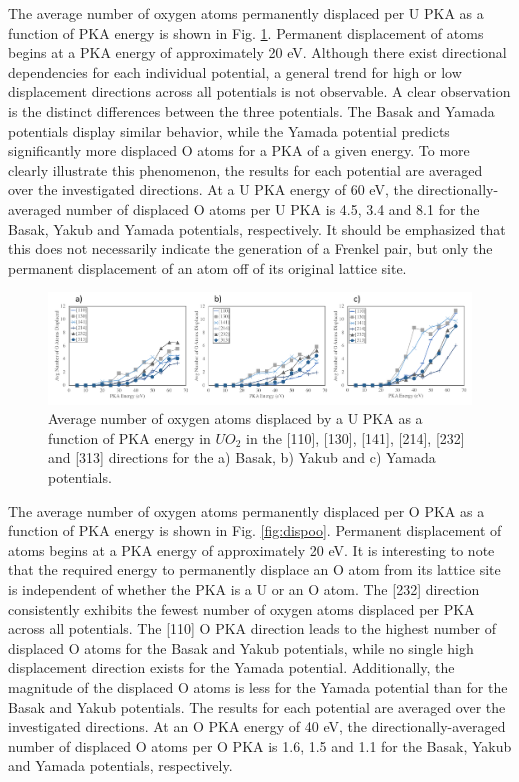 \documentclass[8pt]{article}   	%
\begin{document}
The average number of oxygen atoms permanently displaced per U PKA as a function of PKA energy is shown in Fig. \ref{fig:dispou}. Permanent displacement of atoms begins at a PKA energy of approximately 20 eV. Although there exist directional dependencies for each individual potential, a general trend for high or low displacement directions across all potentials is not observable. A clear observation is the distinct differences between the three potentials. The Basak and Yamada potentials display similar behavior, while the Yamada potential predicts significantly more displaced O atoms for a PKA of a given energy. To more clearly illustrate this phenomenon, the results for each potential are averaged over the investigated directions. At a U PKA energy of 60 eV, the directionally-averaged number of displaced O atoms per U PKA is 4.5, 3.4 and 8.1 for the Basak, Yakub and Yamada potentials, respectively. It should be emphasized that this does not necessarily indicate the generation of a Frenkel pair, but only the permanent displacement of an atom off of its original lattice site. 

\begin{figure}[h]
 \centering
 \includegraphics[width=1.0\textwidth]{dispO_U.png} 
 \caption{Average number of oxygen atoms displaced by a U PKA as a function of PKA energy in $UO_2$ in the [110], [130], [141], [214], [232] and [313] directions for the a) Basak, b) Yakub and c) Yamada potentials.  }
 \label{fig:dispou}
\end{figure}

The average number of oxygen atoms permanently displaced per O PKA as a function of PKA energy is shown in Fig. \ref{fig:dispoo}. Permanent displacement of atoms begins at a PKA energy of approximately 20 eV. It is interesting to note that the required energy to permanently displace an O atom from its lattice site is independent of whether the PKA is a U or an O atom. The [232] direction consistently exhibits the fewest number of oxygen atoms displaced per PKA across all potentials. The [110] O PKA direction leads to the highest number of displaced O atoms for the Basak and Yakub potentials, while no single high displacement direction exists for the Yamada potential. Additionally, the magnitude of the displaced O atoms is less for the Yamada potential than for the Basak and Yakub potentials. The results for each potential are averaged over the investigated directions. At an O PKA energy of 40 eV, the directionally-averaged number of displaced O atoms per O PKA is 1.6, 1.5 and 1.1 for the Basak, Yakub and Yamada potentials, respectively. 
\end{document}
